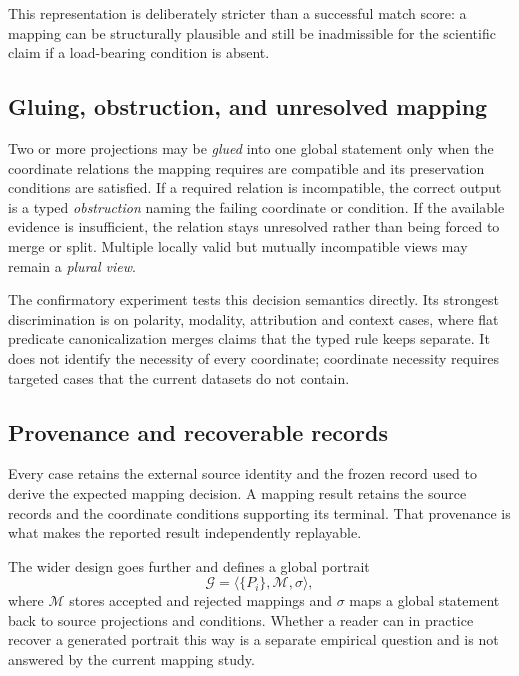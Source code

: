 This representation is deliberately stricter than a successful match score: a
mapping can be structurally plausible and still be inadmissible for the
scientific claim if a load-bearing condition is absent.

\subsection{Gluing, obstruction, and unresolved mapping}

Two or more projections may be \emph{glued} into one global statement only
when the coordinate relations the mapping requires are compatible and its
preservation conditions are satisfied. If a required relation is incompatible,
the correct output is a typed \emph{obstruction} naming the failing coordinate
or condition. If the available evidence is insufficient, the relation stays
unresolved rather than being forced to merge or split. Multiple locally valid
but mutually incompatible views may remain a \emph{plural view}.

The confirmatory experiment tests this decision semantics directly. Its
strongest discrimination is on polarity, modality, attribution and context
cases, where flat predicate canonicalization merges claims that the typed rule
keeps separate. It does not identify the necessity of every coordinate;
coordinate necessity requires targeted cases that the current datasets do not
contain.

\subsection{Provenance and recoverable records}

Every case retains the external source identity and the frozen record used to
derive the expected mapping decision. A mapping result retains the source
records and the coordinate conditions supporting its terminal. That provenance
is what makes the reported result independently replayable.

The wider design goes further and defines a global portrait
\begin{equation}
    \mathcal{G} = \langle \{P_i\}, \mathcal{M}, \sigma \rangle,
\end{equation}
where $\mathcal{M}$ stores accepted and rejected mappings and $\sigma$ maps a
global statement back to source projections and conditions. Whether a reader
can in practice recover a generated portrait this way is a separate empirical
question and is not answered by the current mapping study.

